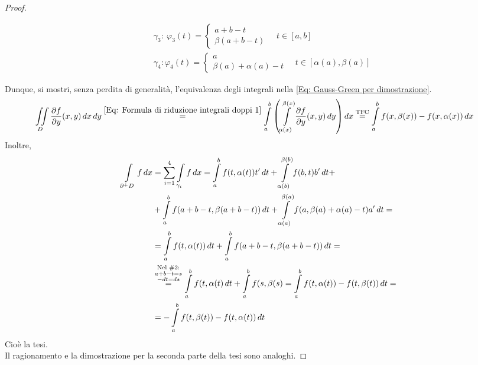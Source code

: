 \begin{proof}
\begin{figure}[H]
\begin{minipage}{0.63\textwidth}
\begin{equation}
\begin{aligned}
                &\gamma_3:\ \varphi_3(t)= \begin{cases}
                    a+b-t\\
                    \beta(a+b-t)
                \end{cases}
                \quad t \in [a,b]\\
                &\gamma_4: \varphi_4(t)= \begin{cases}
                    a\\
                    \beta(a)+\alpha(a)-t
                \end{cases}
                \quad t \in [\alpha(a), \beta(a)]
            \end{aligned}
        \end{equation}
     \end{minipage}
 \end{figure}
 \flushleft Dunque, si mostri, senza perdita di generalità, l'equivalenza degli integrali nella \eqref{Eq: Gauss-Green per dimostrazione}.
 \begin{equation}
    \begin{aligned}
     \iint\limits_D{\frac{\partial f}{\partial y}(x,y)}\,dx\,dy &\overset{\eqref{Eq: Formula di riduzione integrali doppi 1}}{=} \int\limits_{a}^{b}{\left( \int\limits_{\alpha(x)}^{\beta(x)}\frac{\partial f}{\partial y}(x,y)\,dy \right)}\, dx \overset{\text{TFC}}{=}\int\limits_{a}^{b}{ f(x, \beta(x))- f(x, \alpha(x))}\, dx
     \end{aligned}
 \end{equation}
Inoltre, 
\begin{equation}
\begin{aligned}
    \int\limits_{\partial^+ D}{f}\, dx &= \sum\limits_{i=1}^{4} \int\limits_{\gamma_i}{f}\,dx =
    \int\limits_{a}^{b}{f(t, \alpha(t)) t'}\, dt+ \int\limits_{\alpha(b)}^{\beta(b)}{f(b,t)b'}\, dt +\\
    &+\int\limits_{a}^{b}{f(a+b-t, \beta(a+b-t))}\, dt + \int\limits_{\alpha(a)}^{\beta(a)}{f(a, \beta(a)+\alpha(a)-t) a'}\, dt=\\
    &= \int\limits_{a}^{b}{f(t, \alpha(t))}\, dt + \int\limits_{a}^{b}{f(a+b-t, \beta(a+b-t))}\, dt =\\
    &\overset{\substack{\text{Nel }\#2:\\ a+b-t=s\\ -dt=ds}}{=} \int\limits_a^b{f(t, \alpha(t)}\, dt + \int\limits_a^b{f(s, \beta(s)} = \int\limits_{a}^{b}{f(t, \alpha(t))- f(t, \beta(t))}\, dt=\\
    &=-\int\limits_{a}^{b}{ f(t, \beta(t))- f(t, \alpha(t))}\, dt
    \end{aligned}
\end{equation}
Cioè la tesi.\\
Il ragionamento e la dimostrazione per la seconda parte della tesi sono analoghi.
 \end{proof}
